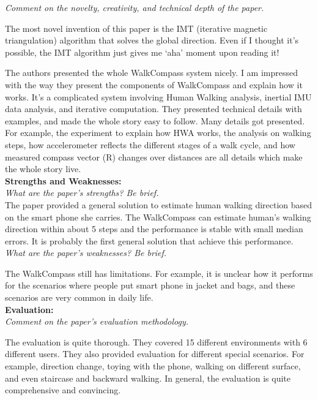 \documentclass[11pt, oneside]{article}   	%
\begin{document}
\noindent \emph{Comment on the novelty, creativity, and technical depth of the paper.}

The most novel invention of this paper is the IMT (iterative magnetic triangulation) algorithm that solves the global direction. Even if I thought it's possible, the IMT algorithm just gives me `aha' moment upon reading it!

The authors presented the whole WalkCompass system nicely. I am impressed with the way they present the components of WalkCompass and explain how it works. It's a complicated system involving Human Walking analysis, inertial IMU data analysis, and iterative computation. They presented technical details with examples, and made the whole story easy to follow. Many details got presented. For example, the experiment to explain how HWA works, the analysis on walking steps, how accelerometer reflects the different stages of a walk cycle, and how measured compass vector (R) changes over distances are all details which make the whole story live.\\



\noindent \textbf{Strengths and Weaknesses:}\\
\emph{What are the paper’s strengths? Be brief.}\\

The paper provided a general solution to estimate human walking direction based on the smart phone she carries. The WalkCompass can estimate human's walking direction within about 5 steps and the performance is stable with small median errors. It is probably the first general solution that achieve this performance.\\

\noindent \emph{What are the paper's weaknesses? Be brief.}

The WalkCompass still has limitations. For example, it is unclear how it performs for the scenarios where people put smart phone in jacket and bags, and these scenarios are very common in daily life.\\

\noindent \textbf{Evaluation:}\\
\emph{Comment on the paper's evaluation methodology.}

The evaluation is quite thorough. They covered 15 different environments with 6 different users. They also provided evaluation for different special scenarios. For example, direction change, toying with the phone, walking on different surface, and even staircase and backward walking. In general, the evaluation is quite comprehensive and convincing. \\
\end{document}
